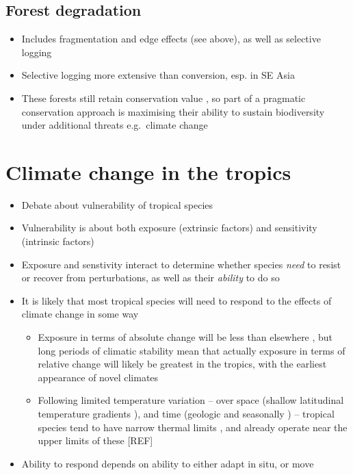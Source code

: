 \documentclass[12pt,a4paper,]{report}
\providecommand{\tightlist}{%
  \setlength{\itemsep}{0pt}\setlength{\parskip}{0pt}}
\theoremstyle{definition}
\theoremstyle{definition}
\theoremstyle{definition}
\theoremstyle{remark}
\begin{document}
\subsection{Forest degradation}\label{forest-degradation}

\begin{itemize}
\tightlist
\item
  Includes fragmentation and edge effects (see above), as well as
  selective logging
\item
  Selective logging more extensive than conversion, esp. in SE Asia
  \citep{hansen_humid_2008, asner_contemporary_2009}
\item
  These forests still retain conservation value
  \citep{edwards_degraded_2011, gibson_primary_2011, edwards_biodiversity_2013},
  so part of a pragmatic conservation approach is maximising their
  ability to sustain biodiversity under additional threats e.g.~climate
  change \citep{maxwell_biodiversity_2016}
\end{itemize}

\section{Climate change in the
tropics}\label{climate-change-in-the-tropics}

\begin{itemize}
\tightlist
\item
  Debate about vulnerability of tropical species
\item
  Vulnerability is about both exposure (extrinsic factors) and
  sensitivity (intrinsic factors) \citep{williams_towards_2008}
\item
  Exposure and senstivity interact to determine whether species
  \emph{need} to resist or recover from perturbations, as well as their
  \emph{ability} to do so
\item
  It is likely that most tropical species will need to respond to the
  effects of climate change in some way

  \begin{itemize}
  \tightlist
  \item
    Exposure in terms of absolute change will be less than elsewhere
    \citep{corlett_impacts_2011, corlett_climate_2012, ipcc_climate_2013},
    but long periods of climatic stability mean that actually exposure
    in terms of relative change will likely be greatest in the tropics,
    with the earliest appearance of novel climates
    \citep{mora_projected_2013}
  \item
    Following limited temperature variation -- over space (shallow
    latitudinal temperature gradients \citep{colwell_global_2008}), and
    time (geologic and seasonally \citep{williams_towards_2008}) --
    tropical species tend to have narrow thermal limits
    \citep{deutsch_impacts_2008, tewksbury_putting_2008, khaliq_global_2014},
    and already operate near the upper limits of these {[}REF{]}
  \end{itemize}
\item
  Ability to respond depends on ability to either adapt in situ, or move
\end{itemize}
\end{document}
